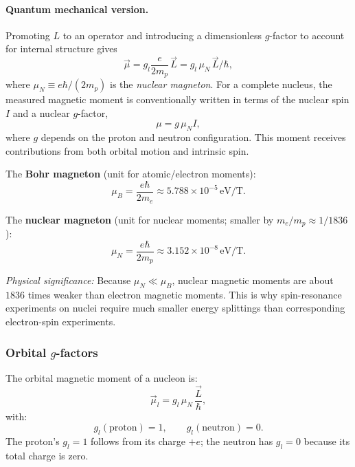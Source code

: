\paragraph{Quantum mechanical version.}
Promoting $L$ to an operator and introducing a dimensionless $g$-factor to account for internal structure gives
\begin{equation}
  \label{eq:qm_magnetic}
  \vec{\mu} = g_l \frac{e}{2m_p}\,\vec{L} = g_l \,\mu_N\, \vec{L}/\hbar,
\end{equation}
where $\mu_N \equiv e\hbar/(2m_p)$ is the \emph{nuclear magneton}.
For a complete nucleus, the measured magnetic moment is conventionally written in terms of the nuclear spin \(I\) and a nuclear \(g\)-factor,
\begin{equation}\label{eq:magnetic_dipole_moment}
  \mu = g\,\mu_N I,
\end{equation}
where \(g\) depends on the proton and neutron configuration.  This moment receives contributions from both orbital motion and intrinsic spin.

The \textbf{Bohr magneton} (unit for atomic/electron moments):
\begin{equation}
  \label{eq:bohr_magneton}
  \mu_B = \frac{e\hbar}{2m_e} \approx 5.788 \times 10^{-5} \, \text{eV/T}.
\end{equation}

The \textbf{nuclear magneton} (unit for nuclear moments; smaller by $m_e/m_p \approx 1/1836$):
\begin{equation}
  \label{eq:nuclear_magneton}
  \mu_N = \frac{e\hbar}{2m_p} \approx 3.152 \times 10^{-8} \, \text{eV/T}.
\end{equation}

\textit{Physical significance:} Because $\mu_N \ll \mu_B$, nuclear magnetic moments are about $1836$ times weaker than electron magnetic moments.  This is why spin-resonance experiments on nuclei require much smaller energy splittings than corresponding electron-spin experiments.

\subsubsection*{Orbital $g$-factors}
The orbital magnetic moment of a nucleon is:
\begin{equation}
  \label{eq:orbital_magnetic_moment}
  \vec{\mu}_l = g_l \,\mu_N\,\frac{\vec{L}}{\hbar},
\end{equation}
with:
\[
  g_l(\text{proton}) = 1, \qquad g_l(\text{neutron}) = 0.
\]
The proton's $g_l = 1$ follows from its charge $+e$; the neutron has $g_l = 0$ because its total charge is zero.

